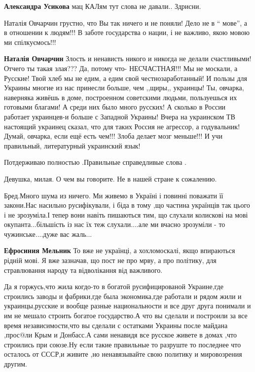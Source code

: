 \begin{itemize}
{\begin{itemize}
\textbf{Александра Усикова} мац КАЛям тут слова не давали.. Здрисни.

Наталія Овчарчин грустно, что Вы так ничего и не поняли! Дело не в \enquote{ мове}, а в
отношении к людям!!! В заботе государства о нации, і не важливо, якою мовою ми
спілкуємось!!!

\textbf{Наталія Овчарчин} Злость и ненависть никого и никогда не делали
счастливыми! Отчего ты такая злая??? Да, потому что- НЕСЧАСТНАЯ!!! Мы не
москали, а Русские! Твой хлеб мы не едим, а едим свой честнозаработанный! И
пользы для Украины многие из нас принесли больше, чем ,,щиры,, украинцы! Ты,
овчарка, наверняка живёшь в доме, построенном советскими людьми, пользуешься их
готовыми благами! А среди них было много русских! А сколько в России работает
украинцев-и больше с Западной Украины! Вчера на украинском ТВ настоящий
украинец сказал, что для таких Россия не агрессор, а годувальник! Думай,
овчарка, если ещё есть чем!!! Злоба делает мозг меньше!!! И учи правильный,
литературный украинский язык!
\end{itemize}


Потдерживаю полностью .Правильные справедливые слова .


Девушка, милая. О чем вы говорите. Не в нашей стране к сожалению.


Бред.Много шума из ничего. Ми живемо в Україні і повинні поважати її закони.Нас
насильно русифікували, і біда в тому ,що частина українців так цього і не
зрозуміла.І тепер вони навіть пишаються тим, що слухали колискові на мові
окупанта...більшість із нас їх теж слухали....але ми вчасно зрозуміли - то
чужинське....дуже вас жаль...

\begin{itemize}

\textbf{Ефросиния Мельник} То вже не українці, а хохломоскалі, якщо впираються рідній мові.
Я вже зазначав, що пост не про мрву, а про політику, для стравлювання народу та
відволікання від важливого.


Да я горжусь,что жила когдо-то в богатой русифицированой Украине,где строились заводы и фабрики,где была экономика,где работали и рядом жили и украинцы,русские и вообще разные национальности и все друг друга понимали и им не мешало строить богатое государство.А что вы сделали и построили за все время независимости,что вы сделали с остатками Украины после майдана ,прос@ли Крым и Донбасс.А сами ненавидя все русское живете в домах ,что строились при союзе.Ну если такие правильные то разруште то последнее что осталось от СССР,и живите ,но ненавязывайте свою политику и мировозрения другим.


\end{itemize}}
\end{itemize}
